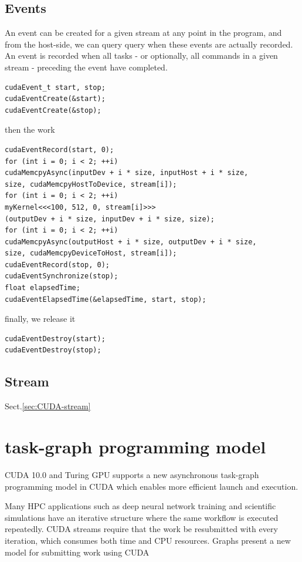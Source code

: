 \subsection{Events}
\label{sec:cuda_events}

An event can be created for a given stream at any point in the program, and from
the host-side, we can query query when these events are actually recorded. An
event is recorded when all tasks - or optionally, all commands in a given stream
- preceding the event have completed.

\begin{lstlisting}
cudaEvent_t start, stop;
cudaEventCreate(&start);
cudaEventCreate(&stop);
\end{lstlisting}
then the work
\begin{lstlisting}
cudaEventRecord(start, 0);
for (int i = 0; i < 2; ++i)
cudaMemcpyAsync(inputDev + i * size, inputHost + i * size,
size, cudaMemcpyHostToDevice, stream[i]);
for (int i = 0; i < 2; ++i)
myKernel<<<100, 512, 0, stream[i]>>>
(outputDev + i * size, inputDev + i * size, size);
for (int i = 0; i < 2; ++i)
cudaMemcpyAsync(outputHost + i * size, outputDev + i * size,
size, cudaMemcpyDeviceToHost, stream[i]);
cudaEventRecord(stop, 0);
cudaEventSynchronize(stop);
float elapsedTime;
cudaEventElapsedTime(&elapsedTime, start, stop);
\end{lstlisting}
finally, we release it
\begin{lstlisting}
cudaEventDestroy(start);
cudaEventDestroy(stop);
\end{lstlisting}


\subsection{Stream}

Sect.\ref{sec:CUDA-stream}


\section{task-graph programming model}
\label{sec:task-graph-programming-model}

CUDA 10.0 and Turing GPU supports a new asynchronous task-graph programming
model in CUDA which enables more efficient launch and execution.

Many HPC applications such as deep neural network training and scientific
simulations have an iterative structure where the same workflow is executed
repeatedly. CUDA streams require that the work be resubmitted with every
iteration, which consumes both time and CPU resources. Graphs present a new
model for submitting work using CUDA


